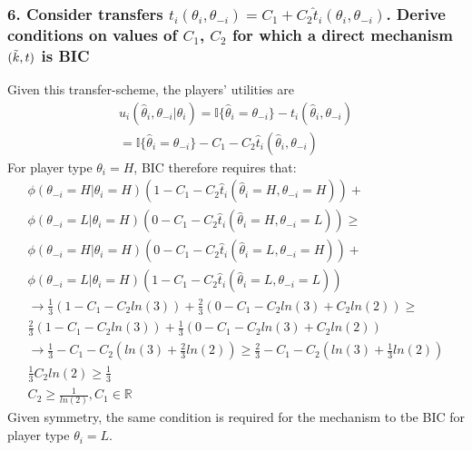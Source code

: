 \documentclass[a4paper]{article}
\begin{document}
	\subsubsection*{6. Consider transfers $t_{i}(\theta_{i},\theta_{-i})=C_{1}+C_{2}\hat{t}_{i}(\theta_{i},\theta_{-i})$. Derive conditions on values of $C_{1}$, $C_{2}$ for which a direct mechanism $(\Tilde{k},t)$ is BIC}
	Given this transfer-scheme, the players' utilities are
	\begin{align}
		u_{i}(\hat{\theta}_{i}, \theta_{-i}|\theta_{i})=\mathbb{I}\{\hat{\theta}_{i}=\theta_{-i}\}-t_{i}(\hat{\theta}_{i},\theta_{-i}) \nonumber\\
		=\mathbb{I}\{\hat{\theta}_{i}=\theta_{-i}\}-C_{1}-C_{2}\hat{t}_{i}(\hat{\theta}_{i},\theta_{-i})
	\end{align}
	For player type $\theta_{i}=H$, BIC therefore requires that:
	\begin{align}
		\phi(\theta_{-i}=H|\theta_{i}=H)(1-C_{1}-C_{2}\hat{t}_{i}(\hat{\theta}_{i}=H,\theta_{-i}=H))+\nonumber\\
		\phi(\theta_{-i}=L|\theta_{i}=H)(0-C_{1}-C_{2}\hat{t}_{i}(\hat{\theta}_{i}=H,\theta_{-i}=L)) \geq \nonumber\\ \phi(\theta_{-i}=H|\theta_{i}=H)(0-C_{1}-C_{2}\hat{t}_{i}(\hat{\theta}_{i}=L,\theta_{-i}=H)) + \nonumber\\ \phi(\theta_{-i}=L|\theta_{i}=H)(1-C_{1}-C_{2}\hat{t}_{i}(\hat{\theta}_{i}=L,\theta_{-i}=L))
		\\
		\rightarrow 
		\frac{1}{3}(1-C_{1}-C_{2}ln(3))+\frac{2}{3}(0-C_{1}-C_{2}ln(3)+C_{2}ln(2)) \geq \nonumber\\ 
		\frac{2}{3}(1-C_{1}-C_{2}ln(3)) + \frac{1}{3}(0-C_{1}-C_{2}ln(3)+C_{2}ln(2))
		\\
		\rightarrow
		\frac{1}{3}-C_{1}-C_{2}\left(ln(3)+\frac{2}{3}ln(2)\right) \geq  \frac{2}{3}-C_{1}-C_{2}\left(ln(3)+\frac{1}{3}ln(2)\right)
		\\
		\frac{1}{3}C_{2}ln(2) \geq \frac{1}{3}\\
		C_{2}\geq \frac{1}{ln(2)}, C_{1}\in\mathbb{R}
	\end{align}
	Given symmetry, the same condition is required for the mechanism to tbe BIC for player type $\theta_{i}=L$.
	
	
\end{document}
